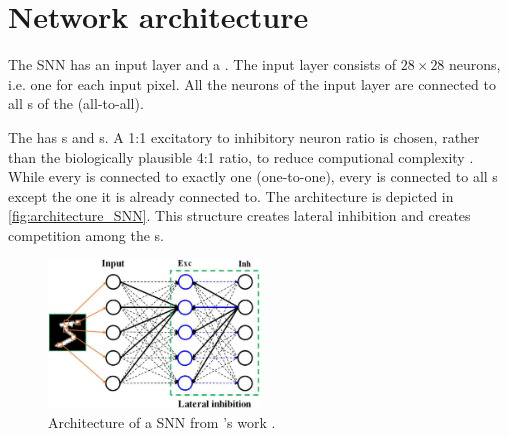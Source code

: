 \section{Network architecture}
\label{subsec:architecture}


The \ac{SNN} has an input layer and a \pLayer{} \cite{SNN}.
The input layer consists of $28 \times 28$ neurons, i.e. one for each input pixel.
All the neurons of the input layer are connected to all \eN{}s of the \pLayer{} (all-to-all).

The \pLayer{} has \eN{}s and \iN{}s.
A 1:1 excitatory to inhibitory neuron ratio is chosen, rather than the biologically plausible 4:1 ratio, 
to reduce computional complexity \cite{SNN}.
While every \eN{} is connected to exactly one \iN{} (one-to-one), every \iN{} is connected to all \eN{}s except the one it is already connected to.
The architecture is depicted in \autoref{fig:architecture_SNN}.
This structure creates lateral inhibition and creates competition among the \eN{}s.
\vspace{-4mm}
\begin{figure}[htbp]
    \center
    \includegraphics[width=0.5\textwidth]{pictures/fnins-15-638474-g001.jpg}
    \caption{Architecture of a \ac{SNN} from \authorsArchitectureSNNpicture{}'s work \cite{architecture_SNN_picture}.}
    \label{fig:architecture_SNN}
\end{figure}